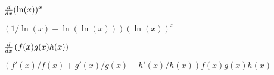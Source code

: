 \begin{exercises}
\begin{exercise}
$\frac{d}{dx} (\ln(x))^x$
\begin{answer}
$(1/\ln(x)+\ln(\ln(x)))(\ln(x))^x$
\end{answer}
\end{exercise}


\begin{exercise}
$\frac{d}{dx} \left(f(x) g(x) h(x)\right)$
\begin{answer}
$(f'(x)/f(x) + g'(x)/g(x) + h'(x)/h(x))f(x) g(x) h(x)$
\end{answer}
\end{exercise}

\endtwocol

\end{exercises}

